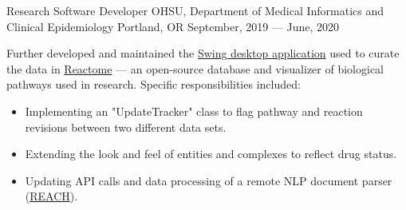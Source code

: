 \showoff
{Research Software Developer}
{OHSU, Department of Medical Informatics and Clinical Epidemiology}
{Portland, OR}
{September, 2019 --- June, 2020}

Further developed and maintained the {\textcolor{my-blue}{\href{https://github.com/reactome/CuratorTool}{Swing desktop application}}} used to curate the data in {\textcolor{my-blue}{\href{https://reactome.org/}{Reactome}}} --- an open-source database and visualizer of biological pathways used in research. Specific responsibilities included:

\begin{itemize}[label=$\triangleright$]
\item Implementing an "UpdateTracker" class to flag pathway and reaction revisions between two different data sets.
\item Extending the look and feel of entities and complexes to reflect drug status.
\item Updating API calls and data processing of a remote NLP document parser (\textcolor{my-blue}{\href{https://github.com/clulab/reach}{REACH}}).
\end{itemize}

